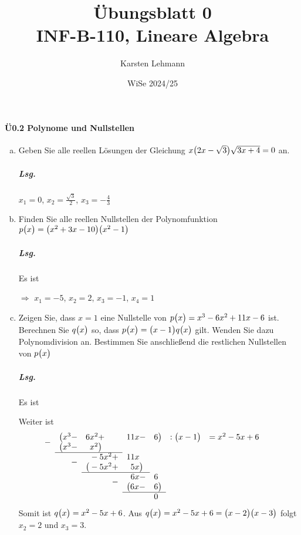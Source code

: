 \documentclass{scrreprt}
\author{Karsten Lehmann}
\date{WiSe 2024/25}
\title{Übungsblatt 0\\INF-B-110, Lineare Algebra}
\newcommand{\dropsign}[1]{\smash{\llap{\raisebox{-.5\normalbaselineskip}{$#1$\hspace{2\arraycolsep}}}}}%
\begin{document}
\paragraph{Ü0.2 Polynome und Nullstellen}
\begin{enumerate}[(a)]
\item Geben Sie alle reellen Lösungen der Gleichung
  $x\qty\big(2x-\sqrt{3})\sqrt{3x+4} = 0$ an.

  \subparagraph{Lsg.} $x_1 = 0$, $x_2 = \frac{\sqrt{3}}{2}$, $x_3 = -\frac{4}{3}$

\item Finden Sie alle reellen Nullstellen der Polynomfunktion
  $p\qty\big(x) = \qty\big(x^2+3x-10)\qty\big(x^2-1)$

  \subparagraph{Lsg.} Es ist
  $\Rightarrow$ $x_1 = -5$, $x_2 = 2$, $x_3 = -1$, $x_4 = 1$

\item Zeigen Sie, dass $x = 1$ eine Nullstelle von
  $p\qty\big(x) = x^3 - 6x^2 + 11x - 6$ ist.
  Berechnen Sie $q\qty\big(x)$ so, dass
  $p\qty\big(x) = \qty\big(x - 1)q\qty\big(x)$ gilt.
  Wenden Sie dazu Polynomdivision an.
  Bestimmen Sie anschließend die restlichen Nullstellen von $p\qty\big(x)$

  \subparagraph{Lsg.} Es ist
  Weiter ist
  \[
    \begin{array}{lllllr}
      \dropsign{-} \big(x^3 - & 6x^2 + &11x - &6\big) &: \qty\big(x - 1) &= x^2 - 5x + 6 \\
      \big(x^3 - &\phantom{6} x^2\big) \\
      \cline{1-2}
      & \dropsign{-} \phantom{\big(} -5x^2 + &11x \\
      & \big(-5x^2 + &\phantom{2}5x\big) \\
      \cline{2-3}
      && \dropsign{-} \phantom{1}6x - &6 \\
      && \big(6x - &6\big) \\
      \cline{3-4}
      &&& 0
    \end{array}
  \]
  Somit ist $q\qty\big(x) = x^2 - 5x + 6$.
  Aus $q\qty\big(x) = x^2 - 5x + 6 = \qty\big(x - 2)\qty\big(x - 3)$ folgt
  $x_2 = 2$ und $x_3 = 3$.
\end{enumerate}
\newpage
\end{document}
